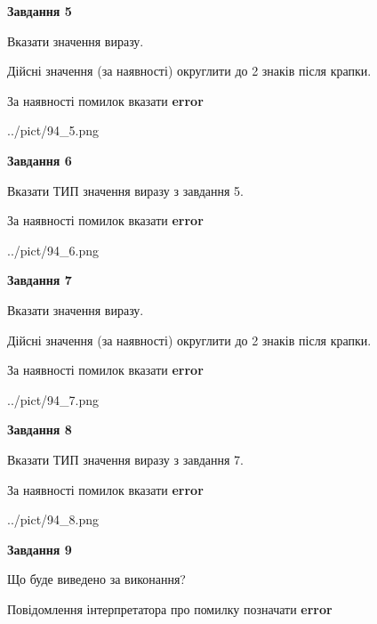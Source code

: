 \documentclass[11pt, ukrainian]{article}
\begin{document}
{\begin {large}
{\begin {center}\textbf{Завдання 5}\end {center}}\par
Вказати значення виразу. \par
Дійсні значення (за наявності) округлити до 2 знаків після крапки. \par
За наявності помилок вказати \textbf{error}

\begin{center}
	{../pict/94_5.png}
\end{center}
\newpage

{\begin {center}\textbf{Завдання 6}\end {center}}\par
Вказати ТИП значення виразу з завдання 5. \par
За наявності помилок вказати \textbf{error}

\begin{center}
	{../pict/94_6.png}
\end{center}
\newpage

{\begin {center}\textbf{Завдання 7}\end {center}}\par
Вказати значення виразу. \par
Дійсні значення (за наявності) округлити до 2 знаків після крапки. \par
За наявності помилок вказати \textbf{error}

\begin{center}
	{../pict/94_7.png}
\end{center}
\newpage

{\begin {center}\textbf{Завдання 8}\end {center}}\par
Вказати ТИП значення виразу з завдання 7. \par
За наявності помилок вказати \textbf{error}

\begin{center}
	{../pict/94_8.png}
\end{center}
\newpage

{\begin {center}\textbf{Завдання 9}\end {center}}\par
Що буде виведено за виконання? \par
Повідомлення інтерпретатора про помилку позначати \textbf{error}


\end{large}}
\end{document}
